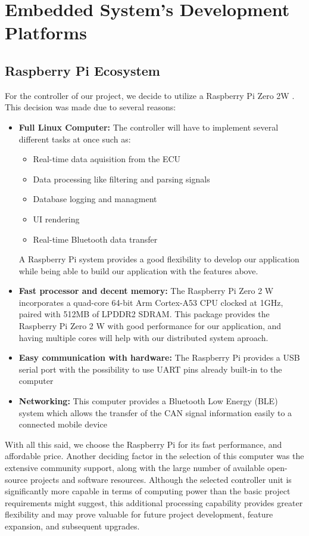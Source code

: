 \section{Embedded System's Development Platforms}

\subsection{Raspberry Pi Ecosystem}

For the controller of our project, we decide to utilize a Raspberry Pi Zero 2W \cite{raspizero2w}. This decision was made due to several reasons:
\begin{itemize}
    \item \textbf{Full Linux Computer:} The controller will have to implement several different tasks at once such as:
    \begin{itemize}
        \item Real-time data aquisition from the ECU
        \item Data processing like filtering and parsing signals
        \item Database logging and managment
        \item UI rendering
        \item Real-time Bluetooth data transfer
    \end{itemize}
    A Raspberry Pi system provides a good flexibility to develop our application while being able to build our application with the features above.
    \item\textbf{Fast processor and decent memory:}
    The Raspberry Pi Zero 2 W incorporates a quad-core 64-bit Arm Cortex-A53 CPU clocked at 1GHz, paired with 512MB of LPDDR2 SDRAM. This package provides the Raspberry Pi Zero 2 W with good performance for our application, and having multiple cores will help with our distributed system aproach.
    
    \item \textbf{Easy communication with hardware:} The Raspberry Pi provides a USB serial port with the possibility to use UART pins already built-in to the computer
    \item \textbf{Networking:} This computer provides a Bluetooth Low Energy (BLE) system which allows the transfer of the CAN signal information easily to a connected mobile device
\end{itemize}

With all this said, we choose the Raspberry Pi for its fast performance, and affordable price. Another deciding factor in the selection of this computer was the extensive community support, along with the large number of available open-source projects and software resources.
Although the selected controller unit is significantly more capable in terms of computing power than the basic project requirements might suggest, this additional processing capability provides greater flexibility and may prove valuable for future project development, feature expansion, and subsequent upgrades.


